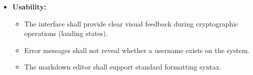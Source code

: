 \begin{itemize}
    \item \textbf{Usability:}
    \begin{itemize}
        \item The interface shall provide clear visual feedback during cryptographic operations (loading states).
        \item Error messages shall not reveal whether a username exists on the system.
        \item The markdown editor shall support standard formatting syntax.
    \end{itemize}
\end{itemize}
